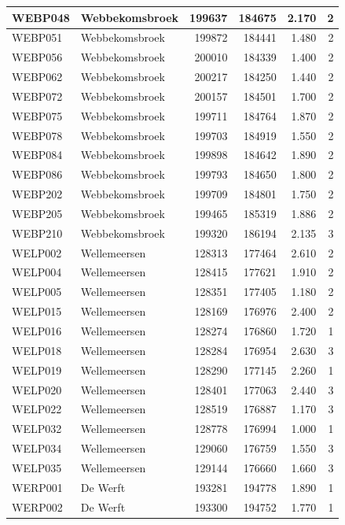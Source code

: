 \documentclass[11pt,]{book}
\begin{document}
\begin{table}
\begin{tabular}[t]{l|l|r|r|r|r}
\hline
WEBP048 & Webbekomsbroek & 199637 & 184675 & 2.170 & 2\\
\hline
WEBP051 & Webbekomsbroek & 199872 & 184441 & 1.480 & 2\\
\hline
WEBP056 & Webbekomsbroek & 200010 & 184339 & 1.400 & 2\\
\hline
WEBP062 & Webbekomsbroek & 200217 & 184250 & 1.440 & 2\\
\hline
WEBP072 & Webbekomsbroek & 200157 & 184501 & 1.700 & 2\\
\hline
WEBP075 & Webbekomsbroek & 199711 & 184764 & 1.870 & 2\\
\hline
WEBP078 & Webbekomsbroek & 199703 & 184919 & 1.550 & 2\\
\hline
WEBP084 & Webbekomsbroek & 199898 & 184642 & 1.890 & 2\\
\hline
WEBP086 & Webbekomsbroek & 199793 & 184650 & 1.800 & 2\\
\hline
WEBP202 & Webbekomsbroek & 199709 & 184801 & 1.750 & 2\\
\hline
WEBP205 & Webbekomsbroek & 199465 & 185319 & 1.886 & 2\\
\hline
WEBP210 & Webbekomsbroek & 199320 & 186194 & 2.135 & 3\\
\hline
WELP002 & Wellemeersen & 128313 & 177464 & 2.610 & 2\\
\hline
WELP004 & Wellemeersen & 128415 & 177621 & 1.910 & 2\\
\hline
WELP005 & Wellemeersen & 128351 & 177405 & 1.180 & 2\\
\hline
WELP015 & Wellemeersen & 128169 & 176976 & 2.400 & 2\\
\hline
WELP016 & Wellemeersen & 128274 & 176860 & 1.720 & 1\\
\hline
WELP018 & Wellemeersen & 128284 & 176954 & 2.630 & 3\\
\hline
WELP019 & Wellemeersen & 128290 & 177145 & 2.260 & 1\\
\hline
WELP020 & Wellemeersen & 128401 & 177063 & 2.440 & 3\\
\hline
WELP022 & Wellemeersen & 128519 & 176887 & 1.170 & 3\\
\hline
WELP032 & Wellemeersen & 128778 & 176994 & 1.000 & 1\\
\hline
WELP034 & Wellemeersen & 129060 & 176759 & 1.550 & 3\\
\hline
WELP035 & Wellemeersen & 129144 & 176660 & 1.660 & 3\\
\hline
WERP001 & De Werft & 193281 & 194778 & 1.890 & 1\\
\hline
WERP002 & De Werft & 193300 & 194752 & 1.770 & 1\\

\end{tabular}
\end{table}
\end{document}

